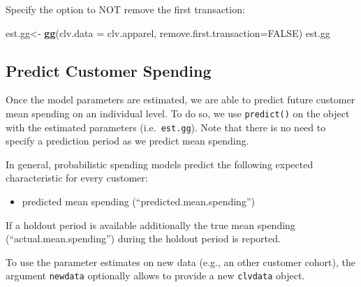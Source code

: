 \documentclass[
]{article}
\newenvironment{Shaded}{\begin{snugshade}}{\end{snugshade}}
\newcommand{\AttributeTok}[1]{\textcolor[rgb]{0.13,0.29,0.53}{#1}}
\newcommand{\ConstantTok}[1]{\textcolor[rgb]{0.56,0.35,0.01}{#1}}
\newcommand{\FunctionTok}[1]{\textcolor[rgb]{0.13,0.29,0.53}{\textbf{#1}}}
\newcommand{\NormalTok}[1]{#1}
\newcommand{\OtherTok}[1]{\textcolor[rgb]{0.56,0.35,0.01}{#1}}
\providecommand{\tightlist}{%
  \setlength{\itemsep}{0pt}\setlength{\parskip}{0pt}}
\begin{document}
Specify the option to NOT remove the first transaction:

\begin{Shaded}
\begin{Highlighting}[]
\NormalTok{est.gg}\OtherTok{\textless{}{-}} \FunctionTok{gg}\NormalTok{(}\AttributeTok{clv.data =}\NormalTok{ clv.apparel, }\AttributeTok{remove.first.transaction=}\ConstantTok{FALSE}\NormalTok{)}
\NormalTok{est.gg}
\end{Highlighting}
\end{Shaded}

\subsection{Predict Customer Spending}\label{predictspending}

Once the model parameters are estimated, we are able to predict future
customer mean spending on an individual level. To do so, we use
\texttt{predict()} on the object with the estimated parameters
(i.e.~\texttt{est.gg}). Note that there is no need to specify a
prediction period as we predict mean spending.

In general, probabilistic spending models predict the following expected
characteristic for every customer:

\begin{itemize}
\tightlist
\item
  predicted mean spending (``predicted.mean.spending'')
\end{itemize}

If a holdout period is available additionally the true mean spending
(``actual.mean.spending'') during the holdout period is reported.

To use the parameter estimates on new data (e.g., an other customer
cohort), the argument \texttt{newdata} optionally allows to provide a
new \texttt{clvdata} object.
\end{document}
